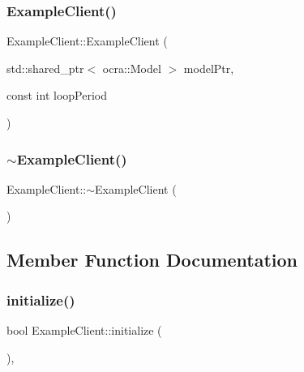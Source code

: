 \subsubsection{\texorpdfstring{Example\+Client()}{ExampleClient()}}
{\footnotesize\ttfamily Example\+Client\+::\+Example\+Client (\begin{DoxyParamCaption}\item[{std\+::shared\+\_\+ptr$<$ ocra\+::\+Model $>$}]{model\+Ptr,  }\item[{const int}]{loop\+Period }\end{DoxyParamCaption})}

\hypertarget{classExampleClient_abdca7dbe5fdab81d7d661a677e5ccd14}{}\label{classExampleClient_abdca7dbe5fdab81d7d661a677e5ccd14} 
\subsubsection{\texorpdfstring{$\sim$\+Example\+Client()}{~ExampleClient()}}
{\footnotesize\ttfamily Example\+Client\+::$\sim$\+Example\+Client (\begin{DoxyParamCaption}{ }\end{DoxyParamCaption})\hspace{0.3cm}{\ttfamily [virtual]}}



\subsection{Member Function Documentation}
\hypertarget{classExampleClient_ad504d1d87997fc95bfeca6aa925a4fa6}{}\label{classExampleClient_ad504d1d87997fc95bfeca6aa925a4fa6} 
\subsubsection{\texorpdfstring{initialize()}{initialize()}}
{\footnotesize\ttfamily bool Example\+Client\+::initialize (\begin{DoxyParamCaption}{ }\end{DoxyParamCaption})\hspace{0.3cm}{\ttfamily [protected]}, {\ttfamily [virtual]}}

\hypertarget{classExampleClient_afb58f3425aafe2d4c38195cb3c667dbc}{}\label{classExampleClient_afb58f3425aafe2d4c38195cb3c667dbc} 
